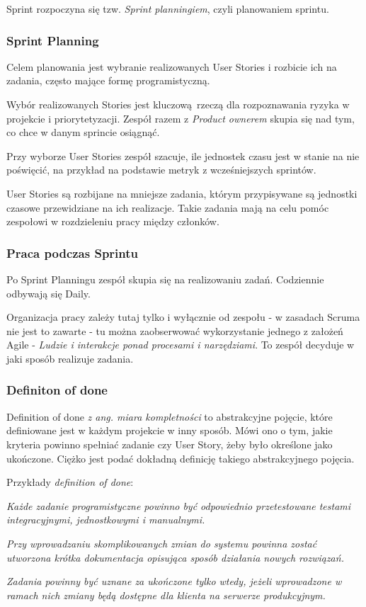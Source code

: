 \documentclass{article}
\begin{document}
Sprint rozpoczyna się tzw. \textit{Sprint planningiem}, czyli planowaniem sprintu.

\subsubsection*{Sprint Planning}

Celem planowania jest wybranie realizowanych User Stories i rozbicie ich na zadania, często mające formę programistyczną.

Wybór realizowanych Stories jest kluczową rzeczą dla rozpoznawania ryzyka w projekcie i priorytetyzacji. Zespół razem z \textit{Product ownerem} skupia się nad tym, co chce w danym sprincie osiągnąć\cite{scrum}.

Przy wyborze User Stories zespół szacuje, ile jednostek czasu jest w stanie na nie poświęcić, na przykład na podstawie metryk z wcześniejszych sprintów\cite{scrum}.

User Stories są rozbijane na mniejsze zadania, którym przypisywane są jednostki czasowe przewidziane na ich realizacje. Takie zadania mają na celu pomóc zespołowi w rozdzieleniu pracy między członków.

\subsubsection*{Praca podczas Sprintu}
Po Sprint Planningu zespół skupia się na realizowaniu zadań. Codziennie odbywają się Daily.

Organizacja pracy zależy tutaj tylko i wyłącznie od zespołu - w zasadach Scruma nie jest to zawarte - tu można zaobserwować wykorzystanie jednego z założeń Agile - \textit{Ludzie i interakcje ponad procesami i narzędziami}. To zespół decyduje w jaki sposób realizuje zadania.

\subsubsection*{Definiton of done}
Definition of done \textit{z ang. miara kompletności} to abstrakcyjne pojęcie, które definiowane jest w każdym projekcie w inny sposób. Mówi ono o tym, jakie kryteria powinno spełniać zadanie czy User Story, żeby było określone jako ukończone. Ciężko jest podać dokładną definicję takiego abstrakcyjnego pojęcia.

Przykłady \textit{definition of done}:
\begin{center}
    \textit{Każde zadanie programistyczne powinno być odpowiednio przetestowane testami integracyjnymi, jednostkowymi i manualnymi.}

    \textit{Przy wprowadzaniu skomplikowanych zmian do systemu powinna zostać utworzona krótka dokumentacja opisująca sposób działania nowych rozwiązań.}

    \textit{Zadania powinny być uznane za ukończone tylko wtedy, jeżeli wprowadzone w ramach nich zmiany będą dostępne dla klienta na serwerze produkcyjnym.}
\end{center}
\end{document}
